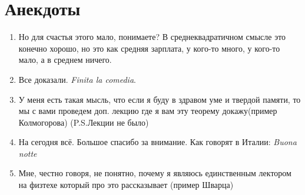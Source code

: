 \newpage
\section{Анекдоты}
\begin{enumerate}
    \item Но для счастья этого мало, понимаете? В среднеквадратичном смысле это конечно хорошо, но это как средняя зарплата, у кого-то много, у кого-то мало, а в среднем ничего.

    \item Все доказали. \textit{Finita la comedia}.

    \item У меня есть такая мысль, что если я буду в здравом уме и твердой памяти, то мы с вами проведем доп. лекцию где я вам эту теорему докажу(пример Колмогорова) (P.S.Лекции не было)

    \item На сегодня всё. Большое спасибо за внимание. Как говорят в Италии: \textit{Buona notte}

    \item Мне, честно говоря, не понятно, почему я являюсь единственным лектором на физтехе который про это рассказывает (пример Шварца)
\end{enumerate}